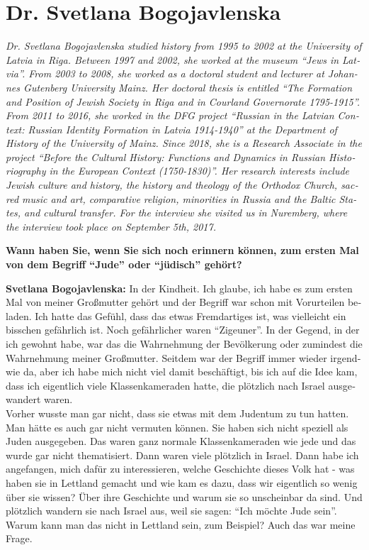 \section{Dr. Svetlana Bogojavlenska}
\begin{otherlanguage}{ngerman}
\textit{Dr. Svetlana Bogojavlenska studied history from 1995 to 2002 at the University of Latvia in Riga. Between 1997 and 2002, she worked at the museum ``Jews in Latvia''. From 2003 to 2008, she worked as a doctoral student and lecturer at Johannes Gutenberg University Mainz. Her doctoral thesis is entitled ``The Formation and Position of Jewish Society in Riga and in Courland Governorate 1795-1915''. From 2011 to 2016, she worked in the DFG project ``Russian in the Latvian Context: Russian Identity Formation in Latvia 1914-1940'' at the Department of History of the University of Mainz. Since 2018, she is a Research Associate in the project ``Before the Cultural History: Functions and Dynamics in Russian Historiography in the European Context (1750-1830)''. Her research interests include Jewish culture and history, the history and theology of the Orthodox Church, sacred music and art, comparative religion, minorities in Russia and the Baltic States, and cultural transfer.
For the interview she visited us in Nuremberg, where the interview took place on September 5th, 2017.}\par
\vspace*{2em}
\textbf{Wann haben Sie, wenn Sie sich noch erinnern können, zum ersten Mal von dem Begriff "`Jude"' oder "`jüdisch"' gehört?}

\textbf{Svetlana Bogojavlenska:} In der Kindheit. Ich glaube, ich habe es zum ersten Mal von meiner Großmutter gehört und der Begriff war schon mit Vorurteilen beladen. Ich hatte das Gefühl, dass das etwas Fremdartiges ist, was vielleicht ein bisschen gefährlich ist. Noch gefährlicher waren "`Zigeuner"'. In der Gegend, in der ich gewohnt habe, war das die Wahrnehmung der Bevölkerung oder zumindest die Wahrnehmung meiner Großmutter. Seitdem war der Begriff immer wieder irgendwie da, aber ich habe mich nicht viel damit beschäftigt, bis ich auf die Idee kam, dass ich eigentlich viele Klassenkameraden hatte, die plötzlich nach Israel ausgewandert waren.\\
Vorher wusste man gar nicht, dass sie etwas mit dem Judentum zu tun hatten. Man hätte es auch gar nicht vermuten können. Sie haben sich nicht speziell als Juden ausgegeben. Das waren ganz normale Klassenkameraden wie jede und das wurde gar nicht thematisiert. Dann waren viele plötzlich in Israel. Dann habe ich angefangen, mich dafür zu interessieren, welche Geschichte dieses Volk hat - was haben sie in Lettland gemacht und wie kam es dazu, dass wir eigentlich so wenig über sie wissen? Über ihre Geschichte und warum sie so unscheinbar da sind. Und plötzlich wandern sie nach Israel aus, weil sie sagen: "`Ich möchte Jude sein"'. Warum kann man das nicht in Lettland sein, zum Beispiel? Auch das war meine Frage.


\end{otherlanguage}
